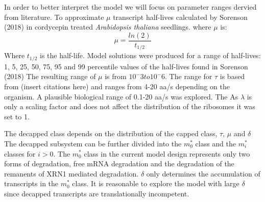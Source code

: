 \documentclass[review]{elsarticle}
\begin{document}
In order to better interpret the model we will focus on parameter ranges dervied from literature. 
To approximate $\mu$ transcript half-lives calculated by Sorenson (2018) in cordycepin treated  \textit{Arabidopsis thaliana} seedlings. where $\mu$ is:
	\begin{equation}\label{eq:eq_capped_sum}
		\mu = \frac{ln(2)}{t_{1/2}}
	\end{equation}
Where $t_{1/2}$ is the half-life. Model solutions were produced for a range of half-lives: 1, 5, 25, 50, 75, 95 and 99 percentile values of the half-lives found in Sorenson (2018)%
The resulting range of $\mu$ is from $10^-3 to 10^-6$. 
The range for $\tau$ is based from (insert citations here) and ranges from 4-20 aa/s depending on the organism. A plausible biological range of 0.1-20 aa/s was explored.
The 
As $\lambda$ is only a scaling factor and does not affect the distribution of the ribosomes it was set to 1.
 
		


The decapped class depends on the distribution of the capped class, $\tau$, $\mu$ and $\delta$
The decapped subsystem can be further divided into the $m_0^*$ class and the $m_i^*$ classes for $i>0$.
The $m_0^*$  class in the current model design represents only two forms of degradation, free mRNA degradation and the degradation of the remanents of XRN1 mediated degradation.%
$\delta$ only determines the accumulation of transcripts in the  $m_0^*$  class. It is reasonable to explore the model with   large $\delta$ since decapped transcripts are translationally incompetent. %
\end{document}

